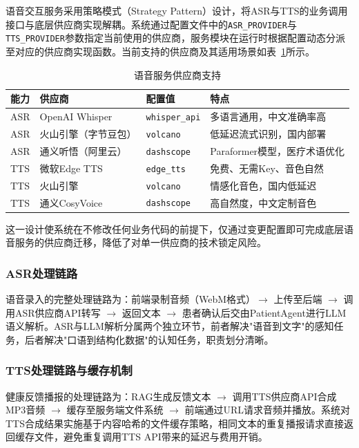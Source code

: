 语音交互服务采用策略模式（Strategy Pattern）设计，将ASR与TTS的业务调用接口与底层供应商实现解耦。系统通过配置文件中的\texttt{ASR\_PROVIDER}与\texttt{TTS\_PROVIDER}参数指定当前使用的供应商，服务模块在运行时根据配置动态分派至对应的供应商实现函数。当前支持的供应商及其适用场景如表~\ref{tab:speech-providers}所示。

\begin{table}[H]
\centering
\caption{语音服务供应商支持}
\label{tab:speech-providers}
\begin{tabularx}{\textwidth}{|l|l|l|X|}
\hline
\textbf{能力} & \textbf{供应商} & \textbf{配置值} & \textbf{特点} \\
\hline
ASR & OpenAI Whisper & \texttt{whisper\_api} & 多语言通用，中文准确率高 \\
\hline
ASR & 火山引擎（字节豆包） & \texttt{volcano} & 低延迟流式识别，国内部署 \\
\hline
ASR & 通义听悟（阿里云） & \texttt{dashscope} & Paraformer模型，医疗术语优化 \\
\hline
TTS & 微软Edge TTS & \texttt{edge\_tts} & 免费、无需Key、音色自然 \\
\hline
TTS & 火山引擎 & \texttt{volcano} & 情感化音色，国内低延迟 \\
\hline
TTS & 通义CosyVoice & \texttt{dashscope} & 高自然度，中文定制音色 \\
\hline
\end{tabularx}
\end{table}

这一设计使系统在不修改任何业务代码的前提下，仅通过变更配置即可完成底层语音服务的供应商迁移，降低了对单一供应商的技术锁定风险。

\subsubsection{ASR处理链路}

语音录入的完整处理链路为：前端录制音频（WebM格式）$\to$ 上传至后端 $\to$ 调用ASR供应商API转写 $\to$ 返回文本 $\to$ 患者确认后交由PatientAgent进行LLM语义解析。ASR与LLM解析分属两个独立环节，前者解决"语音到文字"的感知任务，后者解决"口语到结构化数据"的认知任务，职责划分清晰。

\subsubsection{TTS处理链路与缓存机制}

健康反馈播报的处理链路为：RAG生成反馈文本 $\to$ 调用TTS供应商API合成MP3音频 $\to$ 缓存至服务端文件系统 $\to$ 前端通过URL请求音频并播放。系统对TTS合成结果实施基于内容哈希的文件缓存策略，相同文本的重复播报请求直接返回缓存文件，避免重复调用TTS API带来的延迟与费用开销。


